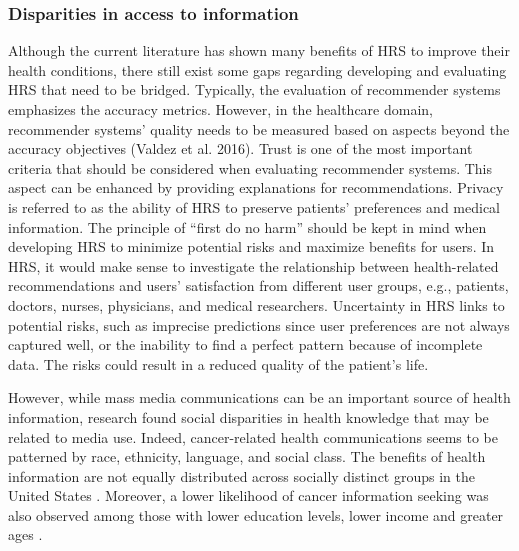 \subsubsection{Disparities in access to information}

Although the current literature has shown many benefits of HRS to improve their health conditions, there still exist some gaps regarding developing and evaluating HRS that need to be bridged. Typically, the evaluation of recommender systems emphasizes the accuracy metrics. However, in the healthcare domain, recommender systems' quality needs to be measured based on aspects beyond the accuracy objectives (Valdez et al. 2016). Trust is one of the most important criteria that should be considered when evaluating recommender systems. This aspect can be enhanced by providing explanations for recommendations. Privacy is referred to as the ability of HRS to preserve patients' preferences and medical information. The principle of ``first do no harm'' should be kept in mind when developing HRS to minimize potential risks and maximize benefits for users. In HRS, it would make sense to investigate the relationship between health-related recommendations and users' satisfaction from different user groups, e.g., patients, doctors, nurses, physicians, and medical researchers. Uncertainty in HRS links to potential risks, such as imprecise predictions since user preferences are not always captured well, or the inability to find a perfect pattern because of incomplete data. The risks could result in a reduced quality of the patient's life.

However, while mass media communications can be an important source of health information, research found social disparities in health knowledge that may be related to media use. Indeed, cancer-related health communications seems to be patterned by race, ethnicity, language, and social class. The benefits of health information are not equally distributed across socially distinct groups in the United States \cite{viswanath_race_2011}. Moreover, a lower likelihood of cancer information seeking was also observed among those with lower education levels, lower income and greater ages \cite{finney_rutten_cancer-related_2016}.
